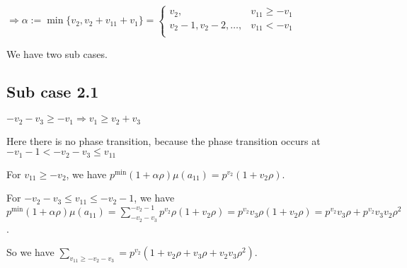 \documentclass{article}
\begin{document}
$\Rightarrow\alpha:=\min\{v_2,v_2+v_{11}+v_1\}=\begin{cases}
       v_2, & v_{11}\geq{-v_1}\\
       v_2-1,v_2-2,\dots, & v_{11}<{-v_1}\\
     \end{cases}$

We have two sub cases.
\subsection{Sub case 2.1}
$-v_2-v_3\geq{-v_1}\Rightarrow{v_1\geq{v_2+v_3}}$

Here there is no phase transition, because the phase transition occurs at $-v_1-1<{-v_2-v_3}\leq{v_{11}}$

For $v_{11}\geq{-v_2}$, we have $p^{\min}(1+\alpha\rho)\mu(a_{11})=p^{v_2}(1+v_2\rho)$.

For $-v_2-v_3\leq{v_{11}}\leq{-v_2-1}$, we have $p^{\min}(1+\alpha\rho)\mu(a_{11})=\sum_{-v_2-v_3}^{-v_2-1}p^{v_2}\rho(1+v_2\rho)=p^{v_2}v_3\rho(1+v_2\rho)=p^{v_2}v_3\rho+p^{v_2}v_3v_2\rho^2$.

So we have $\sum_{v_{11}\geq{-v_2-v_3}}=p^{v_2}(1+v_2\rho+v_3\rho+v_2v_3\rho^2).$
\end{document}

